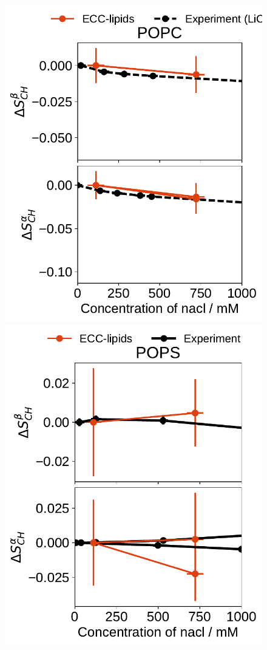 \documentclass[journal=jpcbfk,manuscript=article]{achemso}
\newlength{\figwidth}
\begin{document}
\begin{figure}[htb!] 
  \centering 
  \includegraphics[width=\figwidth]{../Fig/order_parameters_changes_A-B_POPC_nacl.pdf} 
  \includegraphics[width=\figwidth]{../Fig/order_parameters_changes_A-B_POPS_nacl.pdf} 

\end{figure}
\end{document}
